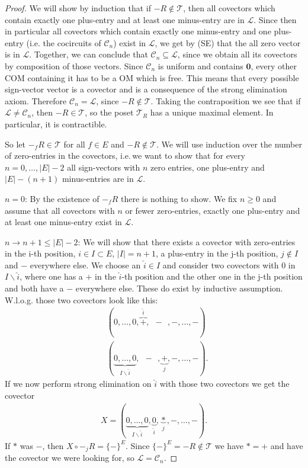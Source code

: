 \documentclass[12pt]{amsart}
\def\Cscr{\mathcal C}
\def\Tscr{{\mathcal T}}
\theoremstyle{plain}
\numberwithin{Lemma}{\DefaultNumberTheoremWithin}
\numberwithin{Claim}{\DefaultNumberTheoremWithin}
\numberwithin{Theorem}{\DefaultNumberTheoremWithin}
\numberwithin{Corollary}{\DefaultNumberTheoremWithin}
\numberwithin{Proposition}{\DefaultNumberTheoremWithin}
\numberwithin{Conjecture}{\DefaultNumberTheoremWithin}
\numberwithin{Situation}{\DefaultNumberTheoremWithin}
\numberwithin{Note}{\DefaultNumberTheoremWithin}
\theoremstyle{definition}
\numberwithin{Definition}{\DefaultNumberTheoremWithin}
\theoremstyle{definition}
\numberwithin{Question}{\DefaultNumberTheoremWithin}
\theoremstyle{definition}
\numberwithin{Problem}{\DefaultNumberTheoremWithin}
\theoremstyle{remark} \newtheorem{Remark}{Remark}
\numberwithin{Remark}{\DefaultNumberTheoremWithin}
\theoremstyle{remark}
\numberwithin{Example}{\DefaultNumberTheoremWithin}
\numberwithin{Case}{Lemma}
\numberwithin{Step}{Lemma}
\begin{document}
\begin{proof}
We will show by induction that if $-R \notin \mathcal{T}$, then all covectors which contain exactly one plus-entry and at least one minus-entry are in $\mathcal{L}$. Since then in particular all covectors which contain exactly one minus-entry and one plus-entry (i.e. the cocircuits of $\mathcal{C}_n$) exist in $\mathcal{L}$, we get by (SE) that the all zero vector is in $\mathcal{L}$. Together, we can conclude that $\mathcal{C}_n \subseteq \mathcal{L}$, since we obtain all its covectors by composition of those vectors. Since $\mathcal{C}_n$ is uniform and contains $\mathbf{0}$, every other COM containing it has to be a OM which is free. This means that every possible sign-vector vector is a covector and is a consequence of the strong elimination axiom. Therefore $\mathcal{C}_n = \mathcal{L}$, since $-R \notin \mathcal{T}$. Taking the contraposition we see that if $\mathcal{L}\neq \Cscr_n$,
  then $-R\in\Tscr$, so the poset $\Tscr_R$ has a unique maximal element. In particular, it is contractible.

So let $-_{f}R \in \Tscr$ for all $f \in E$ and $-R\notin\Tscr$. We will use induction over the number of zero-entries in the covectors, i.e.\,we want to show that for every $n = 0,\dots,\lvert E \rvert-2$ all sign-vectors with $n$ zero entries, one plus-entry and $\lvert E \rvert-(n+1)$ minus-entries are in $\mathcal{L}$.  

$n=0$: By the existence of $-_{f}R$ there is nothing to show. We fix $n\ge0$ and assume that all covectors with $n$ or fewer zero-entries, exactly one plus-entry and at least one minus-entry exist in $\mathcal{L}$.

$n \rightarrow n+1 \leq \lvert E \rvert-2$: We will show that there
exists a covector with zero-entries in the i-th position, $i \in I
\subset E$, $\lvert I \rvert = n+1$, a plus-entry in the j-th
position, $j \notin I$ and $-$ everywhere else. We choose an $\hat{i}
\in I$ and consider two covectors with $0$ in $I \backslash \hat{i}$,
where one has a $+$ in the $\hat{i}$-th position and the other one
in the j-th position and both have a $-$ everywhere else. These do
exist by inductive assumption. W.l.o.g.  those two covectors look like
this:
\begin{align*}
&(0,\dots,0,\overbrace{+}^{\hat{i}},\;\,-\,\;,-,\dots,-)\\
&(\underbrace{0,\dots,0}_{I \backslash \hat{i}},\;\,-\,\;,\underbrace{+}_{j},-,\dots,-).
\end{align*}
 If we now perform strong elimination on $ \hat i$ with those two covectors we get the covector
\begin{align*}
X = (\underbrace{0,\dots,0}_{I \backslash \hat{i}},\underbrace{0}_{\hat{i}},\underbrace{*}_j,-,\dots,-).
\end{align*}
If $*$ was $-$, then $X \circ -_jR = \{-\}^{E}$. Since $\{-\}^{E}=-R\notin\Tscr$ we have $*=+$ and have the covector we were looking for, so $\mathcal{L} = \Cscr_n$. 

\end{proof}
\end{document}
